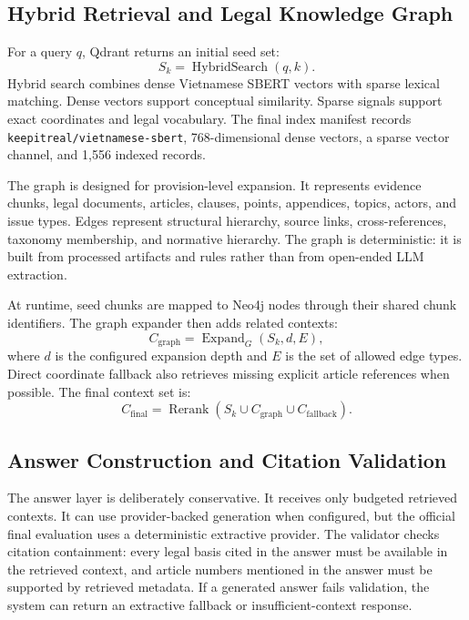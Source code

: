 \subsection{Hybrid Retrieval and Legal Knowledge Graph}
For a query $q$, Qdrant returns an initial seed set:
\[
S_k = \operatorname{HybridSearch}(q,k).
\]
Hybrid search combines dense Vietnamese SBERT vectors with sparse lexical matching. Dense vectors support conceptual similarity. Sparse signals support exact coordinates and legal vocabulary. The final index manifest records \texttt{keepitreal/vietnamese-sbert}, 768-dimensional dense vectors, a sparse vector channel, and 1,556 indexed records.

The graph is designed for provision-level expansion. It represents evidence chunks, legal documents, articles, clauses, points, appendices, topics, actors, and issue types. Edges represent structural hierarchy, source links, cross-references, taxonomy membership, and normative hierarchy. The graph is deterministic: it is built from processed artifacts and rules rather than from open-ended LLM extraction.

At runtime, seed chunks are mapped to Neo4j nodes through their shared chunk identifiers. The graph expander then adds related contexts:
\[
C_{\mathrm{graph}} = \operatorname{Expand}_{G}(S_k, d, E),
\]
where $d$ is the configured expansion depth and $E$ is the set of allowed edge types. Direct coordinate fallback also retrieves missing explicit article references when possible. The final context set is:
\[
C_{\mathrm{final}} =
\operatorname{Rerank}(S_k \cup C_{\mathrm{graph}} \cup C_{\mathrm{fallback}}).
\]


\subsection{Answer Construction and Citation Validation}
The answer layer is deliberately conservative. It receives only budgeted retrieved contexts. It can use provider-backed generation when configured, but the official final evaluation uses a deterministic extractive provider. The validator checks citation containment: every legal basis cited in the answer must be available in the retrieved context, and article numbers mentioned in the answer must be supported by retrieved metadata. If a generated answer fails validation, the system can return an extractive fallback or insufficient-context response.

